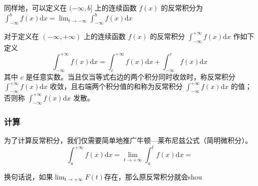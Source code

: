 同样地，可以定义在 $(-\infty,b]$ 上的连续函数 $f(x)$ 的反常积分为 $\displaystyle \int ^b _{-\infty}f(x)\mathrm{d} x=\lim_{t\rightarrow-\infty }\int ^b _{-\infty}f(x)\mathrm{d} x$

对于定义在 $(-\infty,+\infty )$ 上的连续函数 $f(x)$ 的反常积分 $\displaystyle \int ^{+\infty}_{-\infty}f(x)\mathrm{d} x$ 作如下定义
$$\displaystyle \int ^{+\infty}_{-\infty}f(x)\mathrm{d} x=\displaystyle \int ^{+\infty}_c f(x)\mathrm{d} x+\displaystyle \int ^c _{-\infty}f(x)\mathrm{d} x$$
其中 $c$ 是任意实数。当且仅当等式右边的两个积分同时收敛时，称反常积分 $\displaystyle \int ^{+\infty}_{-\infty}f(x)\mathrm{d} x$ 收敛，且右端两个积分值的和称为反常积分 $\displaystyle \int ^{+\infty}_{-\infty}f(x)\mathrm{d} x$ 的值；否则称 $\displaystyle \int ^{+\infty}_{-\infty}f(x)\mathrm{d} x$ 发散。

\subsubsection{计算}
为了计算反常积分，我们仅需要简单地推广牛顿—莱布尼兹公式（简明微积分）。
\begin{equation}
\displaystyle \int ^{+\infty}_a f(x)\mathrm{d} x=\lim_{t\rightarrow+\infty }\int _a^{t}f(x)\mathrm{d} x
=
\end{equation}

换句话说，如果$\lim_{t\rightarrow+\infty } F(t)$存在，那么原反常积分就会shou